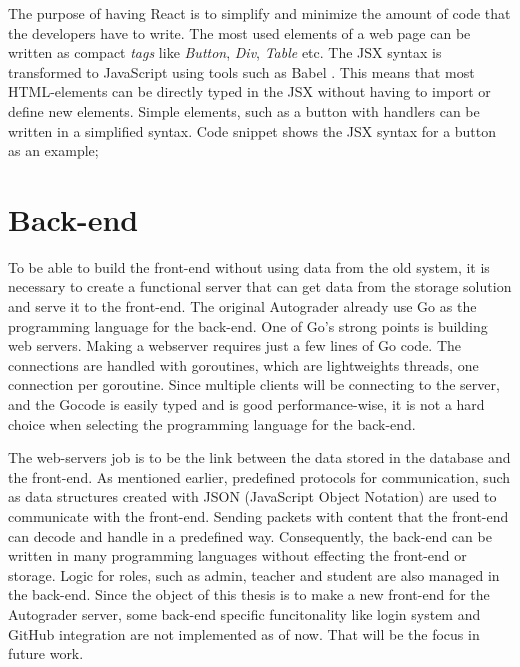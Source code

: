 The purpose of having React is to simplify and minimize the amount of code that the developers have to write. The most used elements of a web page can be written as compact \emph{tags} like \emph{Button}, \emph{Div}, \emph{Table} etc. The JSX syntax is transformed to JavaScript using tools such as Babel . This means that most HTML-elements can be directly typed in the JSX without having to import or define new elements. Simple elements, such as a button with handlers can be written in a simplified syntax. Code snippet  shows the JSX syntax for a button as an example;



\section{Back-end}
To be able to build the front-end without using data from the old system, it is necessary to create a functional server that can get data from the storage solution and serve it to the front-end. The original Autograder already use Go as the programming language for the back-end. One of Go's strong points is building web servers. Making a webserver requires just a few lines of Go code. The connections are handled with goroutines, which are lightweights threads, one connection per goroutine. Since multiple clients will be connecting to the server, and the Gocode is easily typed and is good performance-wise, it is not a hard choice when selecting the programming language for the back-end. 

The web-servers job is to be the link between the data stored in the database and the front-end. As mentioned earlier, predefined protocols for communication, such as data structures created with JSON (JavaScript Object Notation) are used to communicate with the front-end. Sending packets with content that the front-end can decode and handle in a predefined way. Consequently, the back-end can be written in many programming languages without effecting the front-end or storage. Logic for roles, such as admin, teacher and student are also managed in the back-end. Since the object of this thesis is to make a new front-end for the Autograder server, some back-end specific funcitonality like login system and GitHub integration are not implemented as of now. That will be the focus in future work.


